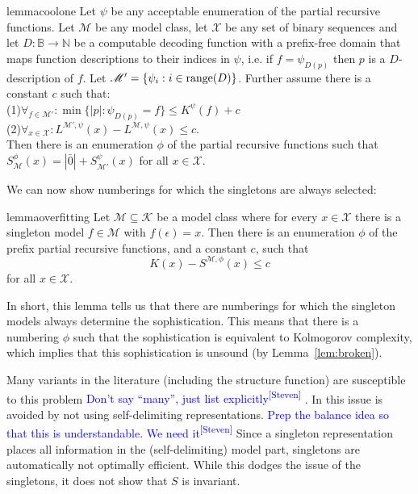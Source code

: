 \documentclass{style/llncs}
\newcommand{\M}{\mathscr M}
\newcommand{\K}{\mathscr K}
\newcommand{\X}{\mathscr X}
\newcommand{\B}{\mathbb B}
\newcommand{\N}{\mathbb N}
\newcommand{\tn}[1]{\textnormal{#1}}
\newcommand{\sdr}[1]{\textcolor{blue}{\small #1\textsuperscript{[Steven]} }}
\begin{document}
\begin{restatable}{lemma}{coolone}
\label{lemma:thecoolone}
  Let $\psi$ be any acceptable enumeration of the partial recursive functions.
  Let $\M$ be any model class, let $\X$ be any set of binary sequences and let $D:\B\to\N$ be a computable decoding function with a prefix-free domain that maps function descriptions to their indices in $\psi$, i.e. if $f=\psi_{D(p)}$ then $p$ is a $D$-description of $f$. Let $\M'=\{\psi_i:i\in\tn{range}(D)\}$. Further assume there is a constant $c$ such that:\\
\-\hspace{1cm}(1)$\forall_{f\in\M'}:\min\{|p|:\psi_{D(p)}=f\}\le K^\psi(f)+c$\\
\-\hspace{1cm}(2)$\forall_{x\in\X}:L^{\M',\psi}(x)-L^{\M,\psi}(x)\le c$.\\
Then there is an enumeration $\phi$ of the partial recursive functions such that $S^\phi_{\M}(x) = |\bar 0|+S^\psi_{\M'}(x)$ for all $x\in\X$.
\end{restatable}
\noindent We can now show numberings for which the singletons are always selected:

\begin{restatable}[Overfitting]{lemma}{overfitting}
Let $\M \subseteq \K$ be a model class where for every $x\in\X$ there is a singleton model $f\in\M$ with $f(\epsilon)=x$. Then there is an enumeration $\phi$ of the prefix partial recursive functions, and a constant $c$, such that
\[
K(x)-S^{\M,\phi}(x)\le c
\]
for all $x\in\X$.
\end{restatable}
\noindent In short, this lemma tells us that there are numberings for which the singleton models always determine the sophistication. This means that there is a numbering $\phi$ such that the sophistication is equivalent to Kolmogorov complexity, which implies that this sophistication is unsound (by Lemma~\ref{lem:broken}).
 
Many variants in the literature (including the structure function) are susceptible to this problem  \sdr{Don't say ``many'', just list explicitly} \cite{cover1985kolmogorov,gacs2001algorithmic,vereshchagin2013algorithmic}. In \cite{vitanyi2004meaningful,adriaans2012facticity} this issue is avoided by not using self-delimiting representations.
\sdr{Prep the balance idea so that this is understandable. We need it}  Since a singleton representation places all information in the (self-delimiting) model part, singletons are automatically not optimally efficient. While this dodges the issue of the singletons, it does not show that $S$ is invariant. 
\end{document}
